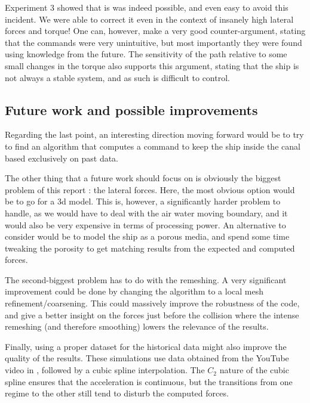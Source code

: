 \documentclass[a4paper]{article}
\begin{document}
Experiment 3 showed that is was indeed possible, and even easy to avoid this incident. We were able to correct it even in the context of insanely high lateral forces and torque! One can, however, make a very good counter-argument, stating that the commands were very unintuitive, but most importantly they were found using knowledge from the future. The sensitivity of the path relative to some small changes in the torque also supports this argument, stating that the ship is not always a stable system, and as such is difficult to control.

\subsection{Future work and possible improvements}
Regarding the last point, an interesting direction moving forward would be to try to find an algorithm that computes a command to keep the ship inside the canal based exclusively on past data.

The other thing that a future work should focus on is obviously the biggest problem of this report : the lateral forces. Here, the most obvious option would be to go for a 3d model. This is, however, a significantly harder problem to handle, as we would have to deal with the air water moving boundary, and it would also be very expensive in terms of processing power. An alternative to consider would be to model the ship as a porous media, and spend some time tweaking the porosity to get matching results from the expected and computed forces.

The second-biggest problem has to do with the remeshing. A very significant improvement could be done by changing the algorithm to a local mesh refinement/coarsening. This could massively improve the robustness of the code, and give a better insight on the forces just before the collision where the intense remeshing (and therefore smoothing) lowers the relevance of the results.

Finally, using a proper dataset for the historical data might also improve the quality of the results. These simulations use data obtained from the YouTube video in \cite{goodvideo}, followed by a cubic spline interpolation. The $C_2$ nature of the cubic spline ensures that the acceleration is continuous, but the transitions from one regime to the other still tend to disturb the computed forces.



\newpage


\end{document}
